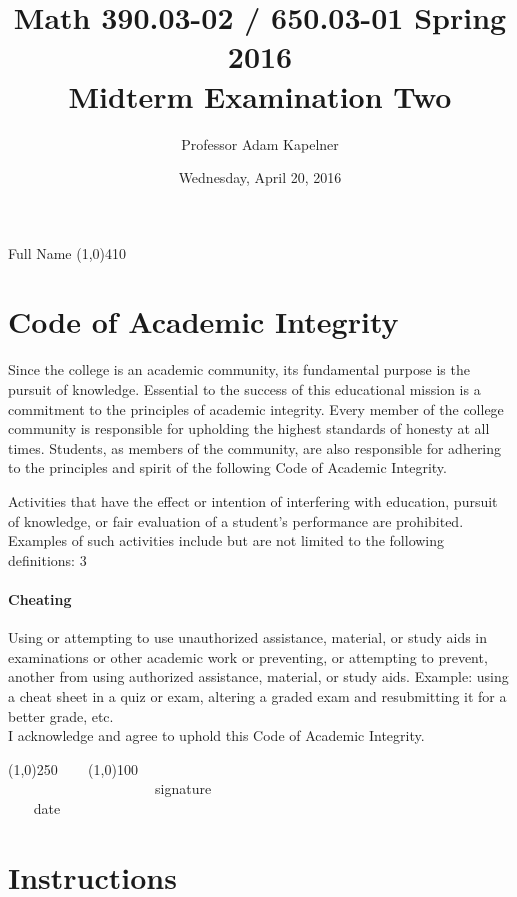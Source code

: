 \documentclass[12pt]{article}
\title{Math 390.03-02 / 650.03-01 Spring 2016 \\ Midterm Examination Two}
\author{Professor Adam Kapelner}
\date{Wednesday, April 20, 2016}
\begin{document}
\maketitle

\noindent Full Name \line(1,0){410}

\thispagestyle{empty}

\section*{Code of Academic Integrity}

\footnotesize
Since the college is an academic community, its fundamental purpose is the pursuit of knowledge. Essential to the success of this educational mission is a commitment to the principles of academic integrity. Every member of the college community is responsible for upholding the highest standards of honesty at all times. Students, as members of the community, are also responsible for adhering to the principles and spirit of the following Code of Academic Integrity.

Activities that have the effect or intention of interfering with education, pursuit of knowledge, or fair evaluation of a student's performance are prohibited. Examples of such activities include but are not limited to the following definitions:
3
\paragraph{Cheating} Using or attempting to use unauthorized assistance, material, or study aids in examinations or other academic work or preventing, or attempting to prevent, another from using authorized assistance, material, or study aids. Example: using a cheat sheet in a quiz or exam, altering a graded exam and resubmitting it for a better grade, etc.
\\

\noindent I acknowledge and agree to uphold this Code of Academic Integrity. \\

\begin{center}
\line(1,0){250} ~~~ \line(1,0){100}\\
~~~~~~~~~~~~~~~~~~~~~signature~~~~~~~~~~~~~~~~~~~~~~~~~~~~~~~~~~~~~~~~~~~~~ date
\end{center}

\normalsize

\section*{Instructions}
\end{document}
